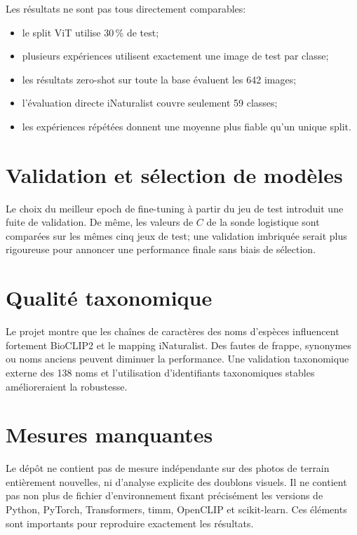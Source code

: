 \documentclass[11pt,a4paper]{report}
\newcommand{\pct}[1]{#1\,\%}
\begin{document}
Les résultats ne sont pas tous directement comparables:
\begin{itemize}
  \item le split ViT utilise \pct{30} de test;
  \item plusieurs expériences utilisent exactement une image de test par classe;
  \item les résultats zero-shot sur toute la base évaluent les 642 images;
  \item l'évaluation directe iNaturalist couvre seulement 59 classes;
  \item les expériences répétées donnent une moyenne plus fiable qu'un unique split.
\end{itemize}

\section{Validation et sélection de modèles}

Le choix du meilleur epoch de fine-tuning à partir du jeu de test introduit une
fuite de validation. De même, les valeurs de $C$ de la sonde logistique sont
comparées sur les mêmes cinq jeux de test; une validation imbriquée serait plus
rigoureuse pour annoncer une performance finale sans biais de sélection.

\section{Qualité taxonomique}

Le projet montre que les chaînes de caractères des noms d'espèces influencent
fortement BioCLIP2 et le mapping iNaturalist. Des fautes de frappe, synonymes ou
noms anciens peuvent diminuer la performance. Une validation taxonomique externe
des 138 noms et l'utilisation d'identifiants taxonomiques stables amélioreraient
la robustesse.

\section{Mesures manquantes}

Le dépôt ne contient pas de mesure indépendante sur des photos de terrain
entièrement nouvelles, ni d'analyse explicite des doublons visuels. Il ne contient
pas non plus de fichier d'environnement fixant précisément les versions de Python,
PyTorch, Transformers, timm, OpenCLIP et scikit-learn. Ces éléments sont importants
pour reproduire exactement les résultats.
\end{document}
